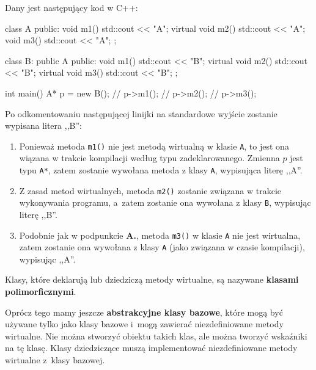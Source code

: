 \begin{exam}
    Dany jest następujący kod w C++:
    \begin{cpp}
        class A {
        public:
            void m1() { std::cout << "A\n"; }
            virtual void m2() { std::cout << "A\n"; }
            void m3() { std::cout << "A\n"; }
        };
    
        class B: public A {
        public:
            void m1() { std::cout << "B\n"; }
            virtual void m2() { std::cout << "B\n"; }
            virtual void m3() { std::cout << "B\n"; }
        };
    
        int main() {
            A* p = new B();
            // p->m1();
            // p->m2();
            // p->m3();
        }
    \end{cpp}
    Po odkomentowaniu następującej linijki na standardowe wyjście zostanie wypisana litera ,,B'':
    
    \begin{enumerate}[\bf A.]
        \item Ponieważ metoda \texttt{m1()} nie jest metodą wirtualną w klasie \texttt{A}, to jest ona wiązana w trakcie kompilacji według typu zadeklarowanego. Zmienna $p$ jest typu \texttt{A*}, zatem zostanie wywołana metoda z klasy \texttt{A}, wypisująca literę ,,A''.
    
        \item Z zasad metod wirtualnych, metoda \texttt{m2()} zostanie związana w trakcie wykonywania programu, a~zatem zostanie ona wywołana z klasy \texttt{B}, wypisując literę ,,B''.
    
        \item Podobnie jak w podpunkcie \textbf{A.}, metoda \texttt{m3()} w klasie \texttt{A} nie jest wirtualna, zatem zostanie ona wywołana z klasy \texttt{A} (jako związana w czasie kompilacji), wypisując ,,A''.
    \end{enumerate}
\end{exam}

Klasy, które deklarują lub dziedziczą metody wirtualne, są nazywane \textbf{klasami polimorficznymi}. 

Oprócz tego mamy jeszcze \textbf{abstrakcyjne klasy bazowe}, które mogą być używane tylko jako klasy bazowe i~mogą zawierać niezdefiniowane metody wirtualne. Nie można stworzyć obiektu takich klas, ale można tworzyć wskaźniki na tę klasę. Klasy dziedziczące muszą implementować niezdefiniowane metody wirtualne z~klasy bazowej.

